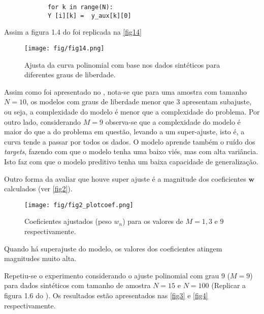 \documentclass{article}
\begin{document}
\begin{itemize}
\begin{verbatim}
  	     	for k in range(N):
  	     	Y [i][k] =  y_aux[k][0]                        
  	     \end{verbatim}  
  	     
  	     
  	     Assim a figura 1.4 do \cite{Bishop2006} foi replicada na \autoref{fig14} 
  	     
  	     \begin{figure}[ht]
  	     	\centering %
  	     	\texttt{[image: fig/fig14.png]} %
  	     	\caption{Ajusta da curva polinomial com base nos dados sintéticos para diferentes graus de liberdade.} %
  	     	\label{fig14} %
  	     \end{figure} 
  	     
  	     
  	     Assim como foi apresentado no \cite{Bishop2006}, nota-se que para uma amostra com tamanho $N=10$, os modelos com graus de liberdade menor que 3 apresentam subajuste, ou seja, a complexidade do modelo é menor que a complexidade do problema. Por outro lado, considerando $M=9$ observa-se que a complexidade do modelo é maior do que a do problema em questão, levando a um super-ajuste, isto é, a curva tende a passar por todos os dados. O modelo aprende também o ruído dos \textit{targets}, fazendo com que o modelo tenha uma baixo viés, mas com alta variância. Isto faz com que o modelo preditivo tenha um baixa capacidade de generalização.
  	     
  	     Outro forma da avaliar que houve super ajuste é a magnitude dos coeficientes $\mathbf{w}$ calculados (ver \autoref{fig2}).
  	     
  	     \begin{figure}[ht]
  	     	\centering %
  	     	\texttt{[image: fig/fig2\_plotcoef.png]} %
  	     	\caption{Coeficientes ajustados (peso $w_{n}$) para os valores de $M=1 ,3$ e $9$ respectivamente.} %
  	     	\label{fig2} %
  	     \end{figure} 
  	     
  	     
  	     Quando há superajuste do modelo, os valores dos coeficientes atingem magnitudes muito alta.
  	     
  	     
  	     Repetiu-se o experimento considerando o ajuste polinomial com grau 9 ($M=9$) para dados sintéticos com tamanho de amostra $N=15$ e $N=100$ (Replicar a figura 1.6 do \cite{Bishop2006}). Os resultados estão apresentados nas \autoref{fig3} e \autoref{fig4} respectivamente. 
  	     

\end{itemize}
\end{document}
